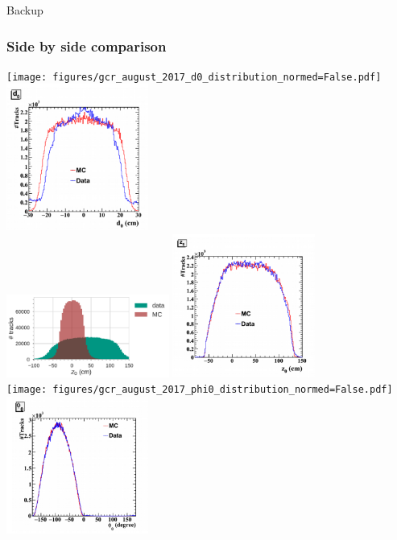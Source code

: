 \documentclass[18pt]{beamer}
\begin{document}
\appendix
\backupbegin

\begin{frame}
  \begin{center}
    \huge Backup
  \end{center}
\end{frame}

\begin{frame}[allowframebreaks]
  \frametitle{Side by side comparison}
  \texttt{[image: figures/gcr\_august\_2017\_d0\_distribution\_normed=False.pdf]}
  \includegraphics[width=0.35\textwidth]{figures/b2gm_d0.png}\\
  
  \includegraphics[width=0.4\textwidth]{figures/gcr_august_2017_z0_distribution_normed=False.pdf}
  \includegraphics[width=0.35\textwidth]{figures/b2gm_z0.png}\\
  
  \texttt{[image: figures/gcr\_august\_2017\_phi0\_distribution\_normed=False.pdf]}
  \includegraphics[width=0.35\textwidth]{figures/b2gm_phi0.png}\\
  

\end{frame}
\end{document}
